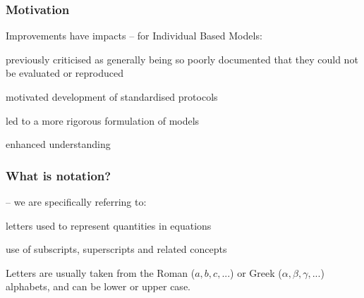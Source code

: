 
\begin{frame}
\frametitle{Motivation}

Improvements have impacts -- for Individual Based Models:

\bi
\item previously criticised as generally being so poorly documented
that they could not be evaluated or reproduced
\item motivated development of standardised protocols
\item led to a more rigorous formulation of models
\item enhanced understanding
\ei
\end{frame}


\begin{frame}
\frametitle{What is notation?}

 -- we are specifically referring to:
\bi
\item letters used to represent quantities in equations
\item use of subscripts, superscripts and related concepts
\ei

Letters are usually taken from the Roman ($a, b, c, ...$) or
Greek ($\alpha, \beta, \gamma, ...$) alphabets, and can be lower or upper case.
\end{frame}


